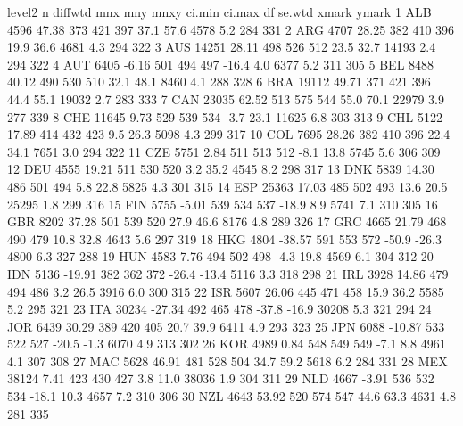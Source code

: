 \documentclass[letterpaper,11pt]{article}
\begin{document}
\begin{Schunk}
\begin{Soutput}
   level2     n diffwtd mnx mny mnxy ci.min ci.max    df se.wtd xmark ymark
1     ALB  4596   47.38 373 421  397   37.1   57.6  4578    5.2   284   331
2     ARG  4707   28.25 382 410  396   19.9   36.6  4681    4.3   294   322
3     AUS 14251   28.11 498 526  512   23.5   32.7 14193    2.4   294   322
4     AUT  6405   -6.16 501 494  497  -16.4    4.0  6377    5.2   311   305
5     BEL  8488   40.12 490 530  510   32.1   48.1  8460    4.1   288   328
6     BRA 19112   49.71 371 421  396   44.4   55.1 19032    2.7   283   333
7     CAN 23035   62.52 513 575  544   55.0   70.1 22979    3.9   277   339
8     CHE 11645    9.73 529 539  534   -3.7   23.1 11625    6.8   303   313
9     CHL  5122   17.89 414 432  423    9.5   26.3  5098    4.3   299   317
10    COL  7695   28.26 382 410  396   22.4   34.1  7651    3.0   294   322
11    CZE  5751    2.84 511 513  512   -8.1   13.8  5745    5.6   306   309
12    DEU  4555   19.21 511 530  520    3.2   35.2  4545    8.2   298   317
13    DNK  5839   14.30 486 501  494    5.8   22.8  5825    4.3   301   315
14    ESP 25363   17.03 485 502  493   13.6   20.5 25295    1.8   299   316
15    FIN  5755   -5.01 539 534  537  -18.9    8.9  5741    7.1   310   305
16    GBR  8202   37.28 501 539  520   27.9   46.6  8176    4.8   289   326
17    GRC  4665   21.79 468 490  479   10.8   32.8  4643    5.6   297   319
18    HKG  4804  -38.57 591 553  572  -50.9  -26.3  4800    6.3   327   288
19    HUN  4583    7.76 494 502  498   -4.3   19.8  4569    6.1   304   312
20    IDN  5136  -19.91 382 362  372  -26.4  -13.4  5116    3.3   318   298
21    IRL  3928   14.86 479 494  486    3.2   26.5  3916    6.0   300   315
22    ISR  5607   26.06 445 471  458   15.9   36.2  5585    5.2   295   321
23    ITA 30234  -27.34 492 465  478  -37.8  -16.9 30208    5.3   321   294
24    JOR  6439   30.29 389 420  405   20.7   39.9  6411    4.9   293   323
25    JPN  6088  -10.87 533 522  527  -20.5   -1.3  6070    4.9   313   302
26    KOR  4989    0.84 548 549  549   -7.1    8.8  4961    4.1   307   308
27    MAC  5628   46.91 481 528  504   34.7   59.2  5618    6.2   284   331
28    MEX 38124    7.41 423 430  427    3.8   11.0 38036    1.9   304   311
29    NLD  4667   -3.91 536 532  534  -18.1   10.3  4657    7.2   310   306
30    NZL  4643   53.92 520 574  547   44.6   63.3  4631    4.8   281   335

\end{Soutput}
\end{Schunk}
\end{document}
